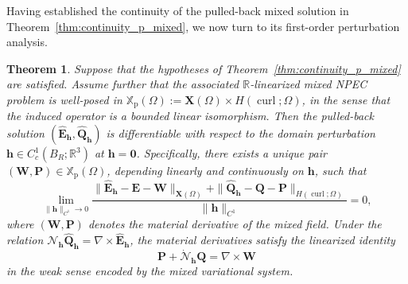 \documentclass[10pt,a4paper]{amsart}
\newtheorem{theo}{Theorem}[section]
\numberwithin{equation}{section}
\begin{document}
Having established the continuity of the pulled-back mixed solution in
Theorem~\ref{thm:continuity_p_mixed}, we now turn to its first-order
perturbation analysis.

\begin{theo}\label{th:p_material_differentiability}
Suppose that the hypotheses of Theorem~\ref{thm:continuity_p_mixed} are satisfied. Assume further that the associated $\mathbb{R}$-linearized mixed NPEC problem is well-posed in $\mathbb{X}_{\mathrm{p}}(\Omega) := \mathbf X(\Omega)\times H(\operatorname{curl};\Omega)$, in the sense that the induced operator is a bounded linear isomorphism. 
Then the pulled-back solution $(\hat{\mathbf{E}}_{\mathbf{h}}, \hat{\mathbf{Q}}_{\mathbf{h}})$ is  differentiable with respect to the domain perturbation $\mathbf{h} \in C_c^1(B_R; \mathbb{R}^3)$ at $\mathbf{h} = \mathbf{0}$. Specifically, there exists a unique pair $(\mathbf{W}, \mathbf{P}) \in \mathbb{X}_{\mathrm{p}}(\Omega)$, depending linearly and continuously on $\mathbf{h}$, such that
\begin{equation*}
\lim_{\|\mathbf{h}\|_{C^1} \to 0} \frac{\|\hat{\mathbf{E}}_{\mathbf{h}} - \mathbf{E} - \mathbf{W}\|_{\mathbf{X}(\Omega)} + \|\hat{\mathbf{Q}}_{\mathbf{h}} - \mathbf{Q} - \mathbf{P}\|_{H(\operatorname{curl};\Omega)}}{\|\mathbf{h}\|_{C^1}} = 0,
\end{equation*}
where $(\mathbf{W}, \mathbf{P})$ denotes the material derivative of the mixed field. Under the relation $\mathcal{N}_{\mathbf{h}} \hat{\mathbf{Q}}_{\mathbf{h}} = \nabla \times \hat{\mathbf{E}}_{\mathbf{h}}$, the material derivatives satisfy the linearized identity
\[
\mathbf{P} + \dot{\mathcal{N}}_{\mathbf{h}} \mathbf{Q} = \nabla \times \mathbf{W}
\]
in the weak sense encoded by the mixed variational system. 


\end{theo}
\end{document}
